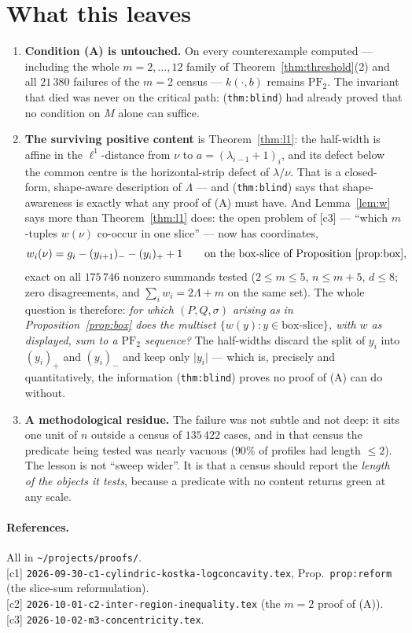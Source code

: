 \documentclass[11pt]{article}
\theoremstyle{definition}
\newcommand{\PFtwo}{\mathrm{PF}_2}
\newcommand{\abs}[1]{\lvert #1\rvert}
\newcommand{\pos}[1]{(#1)_{+}}
\newcommand{\nneg}[1]{(#1)_{-}}
\begin{document}
\section{What this leaves}

\begin{enumerate}
\item \textbf{Condition (A) is untouched.} On every counterexample computed ---
including the whole $m=2,\dots,12$ family of Theorem~\ref{thm:threshold}(2) and all
$21\,380$ failures of the $m=2$ census --- $k(\cdot,b)$ remains $\PFtwo$. The invariant
that died was never on the critical path: (\texttt{thm:blind}) had already proved that no
condition on $M$ alone can suffice.
\item \textbf{The surviving positive content} is Theorem~\ref{thm:l1}: the half-width is
affine in the $\ell^1$-distance from $\nu$ to $a=(\lambda_{i-1}+1)_i$, and its defect
below the common centre is the horizontal-strip defect of $\lambda/\nu$. That is a
closed-form, shape-aware description of $\Lambda$ --- and (\texttt{thm:blind}) says that
shape-awareness is exactly what any proof of (A) must have. And Lemma~\ref{lem:w} says more than
Theorem~\ref{thm:l1} does: the open problem of [c3] --- ``which $m$-tuples $w(\nu)$
co-occur in one slice'' --- now has coordinates,
\[
  w_i(\nu)=g_i-\nneg{y_{i+1}}-\pos{y_i}+1
  \qquad\text{on the box-slice of Proposition~\ref{prop:box},}
\]
exact on all $175\,746$ nonzero summands tested ($2\le m\le5$, $n\le m+5$, $d\le8$; zero
disagreements, and $\sum_iw_i=2\Lambda+m$ on the same set). The whole question is therefore:
\emph{for which $(P,Q,\sigma)$ arising as in Proposition~\ref{prop:box} does the multiset
$\{w(y):y\in\text{box-slice}\}$, with $w$ as displayed, sum to a $\PFtwo$ sequence?} The
half-widths discard the split of $y_i$ into $\pos{y_i}$ and $\nneg{y_i}$ and keep only
$\abs{y_i}$ --- which is, precisely and quantitatively, the information
(\texttt{thm:blind}) proves no proof of (A) can do without.
\item \textbf{A methodological residue.} The failure was not subtle and not deep: it sits
one unit of $n$ outside a census of $135\,422$ cases, and in that census the predicate
being tested was nearly vacuous ($90\%$ of profiles had length $\le2$). The lesson is not
``sweep wider''. It is that a census should report the \emph{length of the objects it
tests}, because a predicate with no content returns green at any scale.
\end{enumerate}

\paragraph{References.} All in \verb|~/projects/proofs/|.\\
\mbox{[c1]} \verb|2026-09-30-c1-cylindric-kostka-logconcavity.tex|, Prop.~\verb|prop:reform|
(the slice-sum reformulation).\\
\mbox{[c2]} \verb|2026-10-01-c2-inter-region-inequality.tex| (the $m=2$ proof of (A)).\\
\mbox{[c3]} \verb|2026-10-02-m3-concentricity.tex|.
\end{document}

